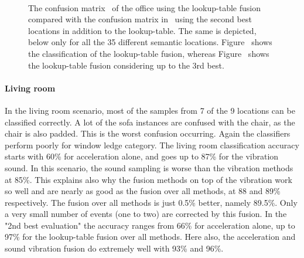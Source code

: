 \begin{figure}[t]
  \begin{center}
	\\
  \end{center}
\caption[Confusion matrices for the distinct classes]{ The confusion matrix~ of the office
 using the lookup-table fusion compared with the confusion matrix
 in~ using the second best locations in
 addition to the lookup-table. The same is depicted, below only for
 all the 35 different semantic locations. Figure~
 shows the classification of the lookup-table fusion, whereas
 Figure~ shows the lookup-table fusion considering
 up to the 3rd best.}
\label{fig:confma}

\end{figure}

\paragraph{Living room}
In the living room scenario, most of the samples from 7 of the 9
locations can be classified correctly. A lot of the sofa instances are
confused with the chair, as the chair is also padded. This is the
worst confusion occurring. Again the classifiers perform poorly for
window ledge category. The living room classification accuracy starts
with 60\% for acceleration alone, and goes up to 87\% for the
vibration sound. In this scenario, the sound sampling is worse than
the vibration methods at 85\%. This explains also why the fusion
methods on top of the vibration work so well and are nearly as good as
the fusion over all methods, at 88 and 89\% respectively. The fusion
over all methods is just 0.5\% better, namely 89.5\%. Only a very
small number of events (one to two) are corrected by this fusion. In
the "2nd best evaluation" the accuracy ranges from 66\% for
acceleration alone, up to 97\% for the lookup-table fusion over all
methods. Here also, the acceleration and sound vibration fusion do
extremely well with 93\% and 96\%.

